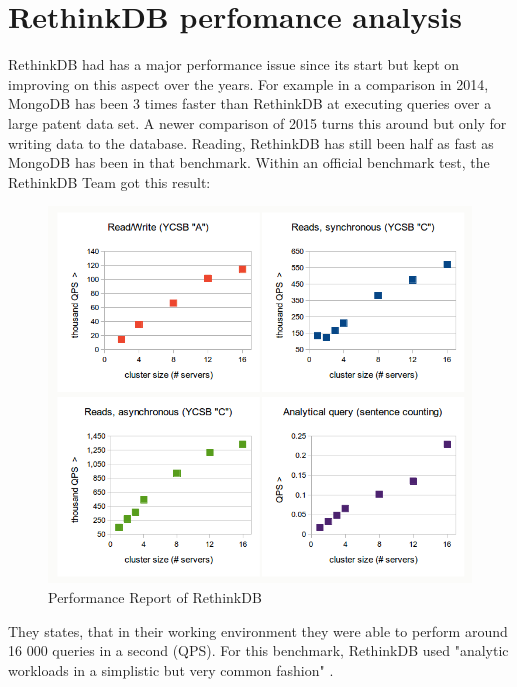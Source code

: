 \section{RethinkDB perfomance analysis}

RethinkDB had has a major performance issue since its start but kept on improving on this aspect over the years. For example in a comparison in 2014, MongoDB has been 3 times faster than RethinkDB at executing queries over a large patent data set\cite{rvsm2014}.
A newer comparison of 2015 turns this around but only for writing data to the database. Reading, RethinkDB has still been half as fast as MongoDB has been in that benchmark\cite{rvsm2016}.
Within an official benchmark test, the RethinkDB Team got this result:

\begin{figure}[H]
	\begin{center}
		\includegraphics[scale=0.6,keepaspectratio]{images/performanceReport.png}
		\caption{Performance Report of RethinkDB \protect\cite{performanceReport}}
	\end{center}
\end{figure}

They states, that in their working environment they were able to perform around 16 000 queries in a second (QPS). For this benchmark, RethinkDB used "analytic workloads in a simplistic but very common fashion" \cite{performanceReport}.